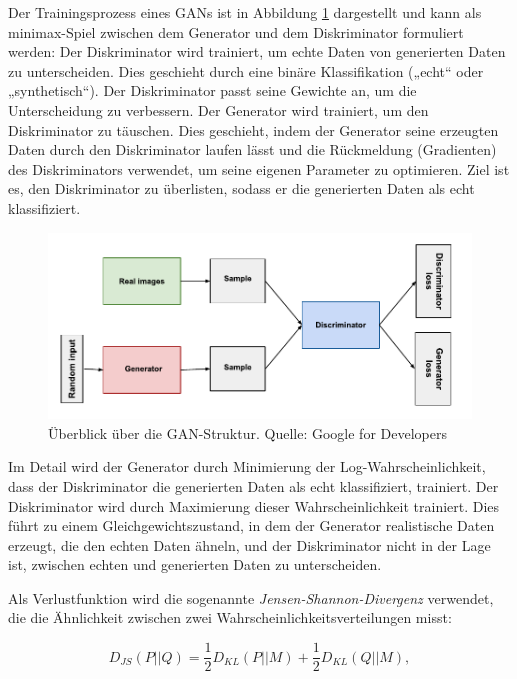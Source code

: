 Der Trainingsprozess eines GANs ist in Abbildung \ref{fig:gan} dargestellt und kann als minimax-Spiel zwischen dem Generator und dem Diskriminator formuliert werden: Der Diskriminator wird trainiert, um echte Daten von generierten Daten zu unterscheiden. Dies geschieht durch eine binäre Klassifikation („echt“ oder „synthetisch“). Der Diskriminator passt seine Gewichte an, um die Unterscheidung zu verbessern. Der Generator wird trainiert, um den Diskriminator zu täuschen. Dies geschieht, indem der Generator seine erzeugten Daten durch den Diskriminator laufen lässt und die Rückmeldung (Gradienten) des Diskriminators verwendet, um seine eigenen Parameter zu optimieren. Ziel ist es, den Diskriminator zu überlisten, sodass er die generierten Daten als echt klassifiziert.

\begin{figure}[h]
	\includegraphics{figure_gan.pdf}
	\caption{Überblick über die GAN-Struktur. Quelle: Google for Developers}
	\label{fig:gan}
\end{figure}

Im Detail wird der Generator durch Minimierung der Log-Wahrscheinlichkeit, dass der Diskriminator die generierten Daten als echt klassifiziert, trainiert. Der Diskriminator wird durch Maximierung dieser Wahrscheinlichkeit trainiert. Dies führt zu einem Gleichgewichtszustand, in dem der Generator realistische Daten erzeugt, die den echten Daten ähneln, und der Diskriminator nicht in der Lage ist, zwischen echten und generierten Daten zu unterscheiden.

Als Verlustfunktion wird die sogenannte \textit{Jensen-Shannon-Divergenz} verwendet, die die Ähnlichkeit zwischen zwei Wahrscheinlichkeitsverteilungen misst:

\begin{equation}
	D_{JS}(P||Q) = \frac{1}{2} D_{KL}(P||M) + \frac{1}{2} D_{KL}(Q||M),
	\label{eq:js-divergence}
\end{equation}


